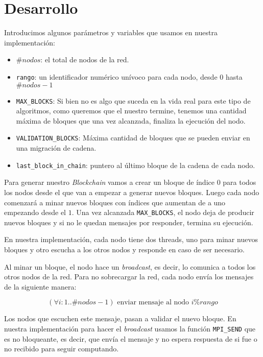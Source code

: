 
\section{Desarrollo}




Introducimos algunos parámetros y variables que usamos en nuestra implementación:
\begin{itemize}
	\item $\#nodos$: el total de nodos de la red.
	\item \texttt{rango}: un identificador numérico unívoco para cada nodo, desde $0$ hasta $\#nodos - 1$
	\item \texttt{MAX\_BLOCKS}: Si bien no es algo que suceda en la vida real para este tipo de algoritmos, como queremos que el nuestro termine, tenemos una cantidad máxima de bloques que una vez alcanzada, finaliza la ejecución del nodo.
	\item \texttt{VALIDATION\_BLOCKS}: Máxima cantidad de bloques que se pueden enviar en una migración de cadena.
	\item \texttt{last\_block\_in\_chain}: puntero al último bloque de la cadena de cada nodo. 
\end{itemize}

Para generar nuestro \textit{Blockchain} vamos a crear un bloque de índice $0$ para todos los nodos desde el que van a empezar a generar nuevos bloques. Luego cada nodo comenzará a minar nuevos bloques con índices que aumentan de a uno empezando desde el $1$. Una vez alcanzada \texttt{MAX\_BLOCKS}, el nodo deja de producir nuevos bloques y si no le quedan mensajes por responder, termina su ejecución.

En nuestra implementación, cada nodo tiene dos threads, uno para minar nuevos bloques y otro escucha a los otros nodos y responde en caso de ser necesario.

Al minar un bloque, el nodo hace un \textit{broadcast}, es decir, lo comunica a todos los otros nodos de la red. Para no sobrecargar la red, cada nodo envía los mensajes de la siguiente manera:

\[
(\forall i : 1 .. \#nodos-1) \text{ enviar mensaje al nodo } i \% rango
\]


Los nodos que escuchen este mensaje, pasan a validar el nuevo bloque. En nuestra implementación para hacer el \textit{broadcast} usamos la función \texttt{MPI\_SEND} que es no bloqueante, es decir, que envía el mensaje y no espera respuesta de si fue o no recibido para seguir computando.

